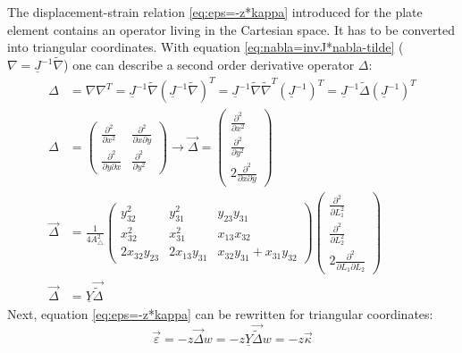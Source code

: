   The displacement-strain relation \eqref{eq:eps=-z*kappa} introduced for the plate element contains an operator living in the Cartesian space. It has to be converted into triangular coordinates. With equation \eqref{eq:nabla=invJ*nabla-tilde} ($\nabla = \underline{J}^{-1}\tilde{\nabla}$) one can describe a second order derivative operator $\Delta$:
  \begin{align}
  \Delta &= \nabla \nabla^T = \underline{J}^{-1}\tilde{\nabla}\left(\underline{J}^{-1}\tilde{\nabla}\right)^T = \underline{J}^{-1} \tilde{\nabla} \tilde{\nabla}^T \left(\underline{J}^{-1}\right)^T = \underline{J}^{-1} \tilde{\Delta} \left(\underline{J}^{-1}\right)^T\\
  \Delta &= \begin{pmatrix}
  \frac{\partial^2}{\partial x^2} & \frac{\partial^2}{\partial x \partial y}\\
  \frac{\partial^2}{\partial y \partial x} & \frac{\partial^2}{\partial y^2}
  \end{pmatrix} \rightarrow \vec{\Delta} = \begin{pmatrix}
  \frac{\partial^2}{\partial x^2} \\
  \frac{\partial^2}{\partial y^2} \\
  2\frac{\partial^2}{\partial x \partial y}
  \end{pmatrix} \nonumber\\
  \vec{\Delta} &= \frac{1}{4 A_\triangle^2} \begin{pmatrix}
  y_{32}^2 & y_{31}^2 & y_{23} y_{31}\\
  x_{32}^2 & x_{31}^2 & x_{13} x_{32}\\
  2 x_{32} y_{23} & 2 x_{13} y_{31} & x_{32} y_{31} + x_{31} y_{32}
  \end{pmatrix} \begin{pmatrix}
  \frac{\partial^2}{\partial L_1^2} \\
  \frac{\partial^2}{\partial L_2^2} \\
  2\frac{\partial^2}{\partial L_1 \partial L_2}
  \end{pmatrix} \nonumber\\
  \vec{\Delta} &= \underline{Y} \vec{\tilde{\Delta}}
  \end{align}
  Next, equation \eqref{eq:eps=-z*kappa} can be rewritten for triangular coordinates:
  \begin{equation}
  \vec{\varepsilon} = -z \vec{\Delta} w = -z \underline{Y} \vec{\tilde{\Delta}} w = -z \vec{\kappa}
  \end{equation}

